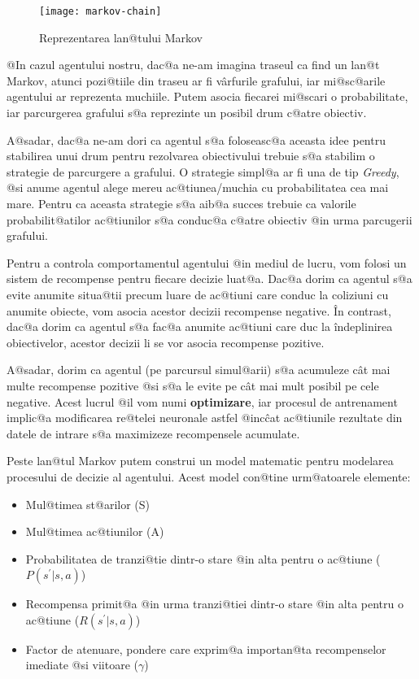 \begin{figure}[h]
	\centering
	\texttt{[image: markov-chain]}
	\caption{Reprezentarea lan@tului Markov}
	\label{fig:markov-chain}
\end{figure}


@In cazul agentului nostru, dac@a ne-am imagina traseul ca find un lan@t Markov, atunci pozi@tiile din traseu ar fi v\^ arfurile grafului, iar mi@sc@arile agentului ar reprezenta muchiile. Putem asocia fiecarei mi@scari o probabilitate, iar parcurgerea grafului s@a reprezinte un posibil drum c@atre obiectiv.

A@sadar, dac@a ne-am dori ca agentul s@a foloseasc@a aceasta idee pentru stabilirea unui drum pentru rezolvarea obiectivului trebuie s@a stabilim o strategie de parcurgere a grafului.
O strategie simpl@a ar fi una de tip {\sl Greedy}, @si anume agentul alege mereu ac@tiunea/muchia cu probabilitatea cea mai mare. Pentru ca aceasta strategie s@a aib@a succes trebuie ca valorile probabilit@atilor ac@tiunilor s@a conduc@a c@atre obiectiv @in urma parcugerii grafului.

Pentru a controla comportamentul agentului @in mediul de lucru, vom folosi un sistem de recompense pentru fiecare decizie luat@a. Dac@a dorim ca agentul s@a evite anumite situa@tii precum luare de ac@tiuni care conduc la coliziuni cu anumite obiecte, vom asocia acestor decizii recompense negative. \^In contrast, dac@a dorim ca agentul s@a fac@a anumite ac@tiuni care duc la \^indeplinirea obiectivelor, acestor decizii li se vor asocia recompense pozitive.

A@sadar, dorim ca agentul (pe parcursul simul@arii) s@a acumuleze c\^ at mai multe recompense pozitive @si s@a le evite pe c\^ at mai mult posibil pe cele negative. Acest lucrul @il vom numi \textbf{optimizare}, iar procesul de antrenament implic@a modificarea re@telei neuronale astfel @inc\^ cat ac@tiunile rezultate din datele de intrare s@a maximizeze recompensele acumulate.

Peste lan@tul Markov putem construi un model matematic pentru modelarea procesului de decizie al agentului. Acest model con@tine urm@atoarele elemente:

\begin{itemize}
	\item Mul@timea st@arilor (S)
	\item Mul@timea ac@tiunilor (A)
	\item Probabilitatea de tranzi@tie dintr-o stare @in alta pentru o ac@tiune ($P(s^{\prime}|s, a)$)
	\item Recompensa primit@a @in urma tranzi@tiei dintr-o stare @in alta pentru o ac@tiune ($R(s^{\prime}|s, a)$)
	\item Factor de atenuare, pondere care exprim@a importan@ta recompenselor imediate @si viitoare ($\gamma$)
\end{itemize}

